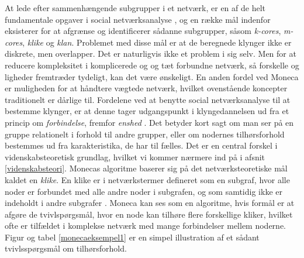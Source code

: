 At lede efter sammenhængende subgrupper i et netværk, er en af de helt fundamentale opgaver i social netværksanalyse \parencite[6]{Touboel2015}, og en række mål indenfor eksisterer for at afgrænse og identificerer sådanne subgrupper, såsom \emph{k-cores}, \emph{m-cores}, \emph{klike} og \emph{klan}.  Problemet med disse mål er at de beregnede klynger ikke er diskrete, men overlapper. Det er naturligvis ikke et problem i sig selv. Men for at reducere kompleksitet i komplicerede og og tæt forbundne netværk, så forskelle og ligheder fremtræder tydeligt, kan det være ønskeligt. En anden fordel ved Moneca er muligheden for at håndtere vægtede netværk, hvilket ovenstående koncepter traditionelt er dårlige til. %
Fordelene ved at benytte social netværksanalyse til at bestemme klynger, er at denne tager udgangspunkt i klyngedannelsen ud fra et princip om \emph{forbindelse}, fremfor \emph{enshed} \parencite[6]{Touboel2015}. Det betyder kort sagt om man ser på en gruppe relationelt i forhold til andre grupper, eller om nodernes tilhørsforhold bestemmes ud fra karakteristika, de har til fælles. Det er en central forskel i videnskabsteoretisk grundlag, hvilket vi kommer nærmere ind på i afsnit \ref{videnskabsteori}. %
Monecas algoritme baserer sig på det netværksteoretiske mål kaldet en \emph{klike}. En klike er i netværkstermer defineret som en subgraf, hvor alle noder er forbundet med alle andre noder i subgrafen, og som samtidig ikke er indeholdt i andre subgrafer \parencite[112]{Scott2000}. Moneca kan ses som en algoritme, hvis formål er at afgøre de tvivlspørgsmål, hvor en node kan tilhøre flere forskellige kliker, hvilket ofte er  tilfældet i komplekse netværk med mange forbindelser mellem noderne. Figur og tabel \ref{monecaeksempel1} er en simpel illustration af et sådant tvivlsspørgsmål om tilhørsforhold. 
%
